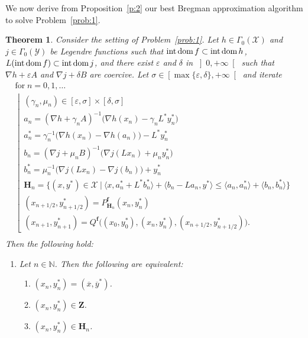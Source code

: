 \documentclass[a4paper,11pt,fleqn]{article}
\renewcommand{\leq}{\ensuremath{\leqslant}}
\newcommand{\pair}[2]{\langle{{#1},{#2}}\rangle}
\newcommand{\menge}[2]{\big\{{#1}~\big |~{#2}\big\}}
\newcommand{\XX}{\ensuremath{{\mathcal X}}}
\newcommand{\XXX}{\ensuremath{\boldsymbol{\mathcal X}}}
\newcommand{\YY}{\ensuremath{{\mathcal Y}}}
\newcommand{\RPP}{\ensuremath{\left]0,+\infty\right[}}
\newcommand{\NN}{\ensuremath{\mathbb N}}
\newcommand{\pinf}{\ensuremath{{+\infty}}}
\newcommand{\intdom}{\ensuremath{\text{\rm int\,dom}\,}}
\newtheorem{theorem}{Theorem}[section]
\theoremstyle{plain}{\theorembodyfont{\rmfamily}%
\newtheorem{conjecture}[theorem]{Conjecture}}
\theoremstyle{plain}{\theorembodyfont{\rmfamily}%
\newtheorem{example}[theorem]{Example}}
\theoremstyle{plain}{\theorembodyfont{\rmfamily}%
\newtheorem{remark}[theorem]{Remark}}
\theoremstyle{plain}{\theorembodyfont{\rmfamily}%
\newtheorem{algorithm}[theorem]{Algorithm}}
\theoremstyle{plain}{\theorembodyfont{\rmfamily}%
\newtheorem{condition}[theorem]{Condition}}
\theoremstyle{plain}{\theorembodyfont{\rmfamily}%
\newtheorem{definition}[theorem]{Definition}}
\theoremstyle{plain}{\theorembodyfont{\rmfamily}
\newtheorem{problem}[theorem]{Problem}}
\theoremstyle{plain}{\theorembodyfont{\rmfamily}
\newtheorem{notation}[theorem]{Notation}}
\numberwithin{equation}{section}
\begin{document}
We now derive from Proposition~\ref{p:2} our best Bregman
approximation algorithm to solve Problem~\ref{prob:1}.

\begin{theorem}
\label{IVt:1}
Consider the setting of Problem~\ref{prob:1}. Let 
$h\in\Gamma_0(\XX)$ and $j\in\Gamma_0(\YY)$ be Legendre 
functions such that $\intdom f\subset\intdom h$, 
$L(\intdom f)\subset\intdom j$, and there exist
$\varepsilon$ and $\delta$ in $\RPP$ such that 
$\nabla h+\varepsilon A$ and $\nabla j+\delta B$ are coercive. 
Let $\sigma\in\left[\max\{\varepsilon,\delta\},\pinf\right[$ 
and iterate
\begin{equation}
\label{IVe:Bfg+uh4f9-09h}
\begin{array}{l}
\text{for}\;n=0,1,\ldots\\
\left\lfloor
\begin{array}{l}
(\gamma_n,\mu_n)\in\left[\varepsilon,\sigma\right]
\times\left[\delta,\sigma\right]\\[1mm]
a_n=(\nabla h+\gamma_nA)^{-1}\big(\nabla h(x_n)-\gamma_n 
L^*y_n^*\big)\\[1mm]
a_n^*=\gamma_n^{-1}\big(\nabla h(x_n)-\nabla h(a_n)\big)-L^*y_n^*
\\[1mm]
b_n=(\nabla j+\mu_nB)^{-1}\big(\nabla j(Lx_n)+\mu_n y_n^*\big)
\\[1mm]
b_n^*=\mu_n^{-1}\big(\nabla j(Lx_n)-\nabla j(b_n)\big)+y_n^*
\\[1mm]
\boldsymbol{H}_n=
\menge{(x,y^*)\in\XXX}{\pair{x}{a_n^*+L^*b_n^*}
+\pair{b_n-La_n}{y^*}\leq\pair{a_n}{a_n^*}+\pair{b_n}{b_n^*}}\\
(x_{n+1/2},y_{n+1/2}^*)=
P_{\boldsymbol{H}_n}^{\boldsymbol{f}}
(x_n,y_n^*)\\
(x_{n+1},y_{n+1}^*)=Q^{\boldsymbol{f}}
\big((x_0,y_0^*),(x_n,y_n^*),(x_{n+1/2},y_{n+1/2}^*)\big).
\end{array}
\right.\\
\end{array}
\end{equation}
Then the following hold:
\begin{enumerate}
\item
\label{IVt:1i} 
Let $n\in\NN$. Then the following are equivalent:
\begin{enumerate}
\item
\label{IVt:1ia} 
$(x_n,y_n^*)=(\overline{x},\overline{y}^*)$.
\item
\label{IVt:1ib} 
$(x_n,y_n^*)\in\boldsymbol{Z}$.
\item
\label{IVt:1ic} 
$(x_n,y_n^*)\in\boldsymbol{H}_n$.

\end{enumerate}
\end{enumerate}
\end{theorem}
\end{document}
